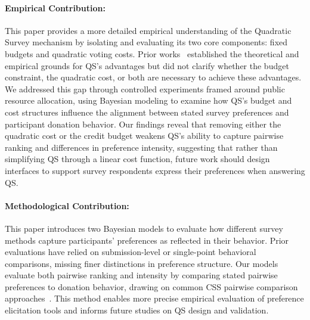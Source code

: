 \paragraph{Empirical Contribution: } 
This paper provides a more detailed empirical understanding of the Quadratic Survey mechanism by isolating and evaluating its two core components: fixed budgets and quadratic voting costs. Prior works~\cite{georgescuFixedbudgetMultipleissueQuadratic2024, eguia2019quadratic, quarfoot2017quadratic, chengCanShowWhat2021} established the theoretical and empirical grounds for QS's advantages but did not clarify whether the budget constraint, the quadratic cost, or both are necessary to achieve these advantages. We addressed this gap through controlled experiments framed around public resource allocation, using Bayesian modeling to examine how QS's budget and cost structures influence the alignment between stated survey preferences and participant donation behavior. Our findings reveal that removing either the quadratic cost or the credit budget weakens QS's ability to capture pairwise ranking and differences in preference intensity, suggesting that rather than simplifying QS through a linear cost function, future work should design interfaces to support survey respondents express their preferences when answering QS.

\paragraph{Methodological Contribution:}
This paper introduces two Bayesian models to evaluate how different survey methods capture participants' preferences as reflected in their behavior. Prior evaluations have relied on submission-level or single-point behavioral comparisons, missing finer distinctions in preference structure. Our models evaluate both pairwise ranking and intensity by comparing stated pairwise preferences to donation behavior, drawing on common CSS pairwise comparison approaches~\cite{collewet2023preference, hauserIntensityMeasuresConsumer1980a}. This method enables more precise empirical evaluation of preference elicitation tools and informs future studies on QS design and validation.




